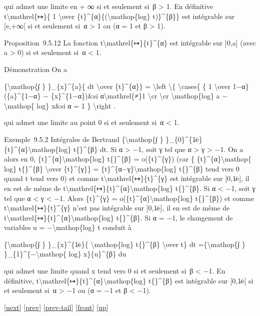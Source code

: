 \documentclass[]{article}
\begin{document}
qui admet une limite en + ∞ si et seulement si~β \textgreater{} 1. En
définitive t\textbackslash{}mathrel\{↦\}\{ 1 \textbackslash{}over
\{t\}\^{}\{α\}\{(\textbackslash{}mathop\{log\} t)\}\^{}\{β\}\} est
intégrable sur {[}e,+∞{[} si et seulement si~α \textgreater{} 1 ou (α =
1 et β \textgreater{} 1).

Proposition~9.5.12 La fonction
t\textbackslash{}mathrel\{↦\}\{t\}\^{}\{α\} est intégrable sur {]}0,a{]}
(avec a \textgreater{} 0) si et seulement si~α \textless{} 1.

Démonstration On a

\{\textbackslash{}mathop\{∫ \} \}\_\{x\}\^{}\{a\}\{ dt
\textbackslash{}over \{t\}\^{}\{α\}\} = \textbackslash{}left
\textbackslash{}\{ \textbackslash{}cases\{ \{ 1 \textbackslash{}over
1−α\} (\{a\}\^{}\{1−α\} − \{x\}\^{}\{1−α\})\&si
α\textbackslash{}mathrel\{≠\}1 \textbackslash{}cr \textbackslash{}cr
\textbackslash{}mathop\{log\} a −\textbackslash{}mathop\{ log\} x\&si α
= 1 \} \textbackslash{}right .

qui admet une limite au point 0 si et seulement si~α \textless{} 1.

Exemple~9.5.2 Intégrales de Bertrand \{\textbackslash{}mathop\{∫ \}
\}\_\{0\}\^{}\{1∕e\}\{t\}\^{}\{α\}\textbar{}\textbackslash{}mathop\{log\}
t\{\textbar{}\}\^{}\{β\} dt. Si α \textgreater{} −1, soit γ tel que α
\textgreater{} γ \textgreater{} −1. On a alors en 0,
\{t\}\^{}\{α\}\textbar{}\textbackslash{}mathop\{log\}
t\{\textbar{}\}\^{}\{β\} = o(\{t\}\^{}\{γ\}) (car \{
\{t\}\^{}\{α\}\textbar{}\textbackslash{}mathop\{ log\}
t\{\textbar{}\}\^{}\{β\} \textbackslash{}over \{t\}\^{}\{γ\}\} =
\{t\}\^{}\{α−γ\}\textbar{}\textbackslash{}mathop\{log\}
t\{\textbar{}\}\^{}\{β\} tend vers 0 quand t tend vers 0) et comme
t\textbackslash{}mathrel\{↦\}\{t\}\^{}\{γ\} est intégrable sur
{]}0,1∕e{]}, il en est de même de
t\textbackslash{}mathrel\{↦\}\{t\}\^{}\{α\}\textbar{}\textbackslash{}mathop\{log\}
t\{\textbar{}\}\^{}\{β\}. Si α \textless{} −1, soit γ tel que α
\textless{} γ \textless{} −1. Alors \{t\}\^{}\{γ\} =
o(\{t\}\^{}\{α\}\textbar{}\textbackslash{}mathop\{log\}
t\{\textbar{}\}\^{}\{β\}) et comme
t\textbackslash{}mathrel\{↦\}\{t\}\^{}\{γ\} n'est pas intégrable sur
{]}0,1∕e{]}, il en est de même de
t\textbackslash{}mathrel\{↦\}\{t\}\^{}\{α\}\textbar{}\textbackslash{}mathop\{log\}
t\{\textbar{}\}\^{}\{β\}. Si α = −1, le changement de variables u =
−\textbackslash{}mathop\{log\} t conduit à

\{\textbackslash{}mathop\{∫ \} \}\_\{x\}\^{}\{1∕e\}\{
\textbar{}\textbackslash{}mathop\{log\} t\{\textbar{}\}\^{}\{β\}
\textbackslash{}over t\} dt =\{\textbackslash{}mathop\{∫ \}
\}\_\{1\}\^{}\{−\textbackslash{}mathop\{ log\} x\}\{u\}\^{}\{β\} du

qui admet une limite quand x tend vers 0 si et seulement si~β
\textless{} −1. En définitive,
t\textbackslash{}mathrel\{↦\}\{t\}\^{}\{α\}\textbar{}\textbackslash{}mathop\{log\}
t\{\textbar{}\}\^{}\{β\} est intégrable sur {[}0,1∕e{[} si et seulement
si~α \textgreater{} −1 ou (α = −1 et β \textless{} −1).

{[}\href{coursse55.html}{next}{]} {[}\href{coursse53.html}{prev}{]}
{[}\href{coursse53.html\#tailcoursse53.html}{prev-tail}{]}
{[}\href{coursse54.html}{front}{]}
{[}\href{coursch10.html\#coursse54.html}{up}{]}
\end{document}
